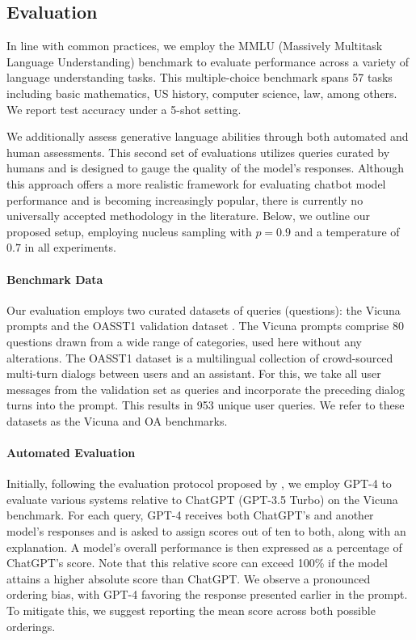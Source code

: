 \subsection{Evaluation}

In line with common practices, we employ the MMLU (Massively Multitask Language Understanding) benchmark \citep{hendrycksmeasuring} to evaluate performance across a variety of language understanding tasks. This multiple-choice benchmark spans 57 tasks including basic mathematics, US history, computer science, law, among others. We report test accuracy under a 5-shot setting.

We additionally assess generative language abilities through both automated and human assessments. This second set of evaluations utilizes queries curated by humans and is designed to gauge the quality of the model's responses. Although this approach offers a more realistic framework for evaluating chatbot model performance and is becoming increasingly popular, there is currently no universally accepted methodology in the literature. Below, we outline our proposed setup, employing nucleus sampling with $p=0.9$ and a temperature of $0.7$ in all experiments.

\paragraph{Benchmark Data} Our evaluation employs two curated datasets of queries (questions): the Vicuna prompts \citep{vicuna2023} and the OASST1 validation dataset \citep{kopf2023openassistant}. The Vicuna prompts comprise 80 questions drawn from a wide range of categories, used here without any alterations. The OASST1 dataset is a multilingual collection of crowd-sourced multi-turn dialogs between users and an assistant. For this, we take all user messages from the validation set as queries and incorporate the preceding dialog turns into the prompt. This results in 953 unique user queries. We refer to these datasets as the Vicuna and OA benchmarks.

\paragraph{Automated Evaluation} Initially, following the evaluation protocol proposed by \citet{vicuna2023}, we employ GPT-4 to evaluate various systems relative to ChatGPT (GPT-3.5 Turbo) on the Vicuna benchmark. For each query, GPT-4 receives both ChatGPT's and another model's responses and is asked to assign scores out of ten to both, along with an explanation. A model's overall performance is then expressed as a percentage of ChatGPT's score. Note that this relative score can exceed 100\% if the model attains a higher absolute score than ChatGPT. We observe a pronounced ordering bias, with GPT-4 favoring the response presented earlier in the prompt. To mitigate this, we suggest reporting the mean score across both possible orderings.

